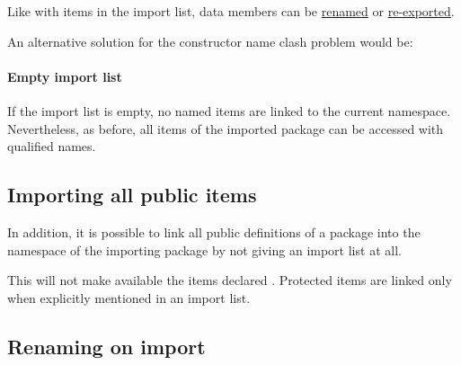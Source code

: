 
Like with items in the import list, data members can be  \hyperref[renameitem]{renamed} 
or  \hyperref[reexport]{re-exported}.
  
An alternative solution for the constructor name clash problem would be:


\paragraph*{Empty import list} If the import list is empty, no named items are linked to the current namespace. Nevertheless, as before, all items of the imported package can be accessed with qualified names.

\subsection{Importing all public items}

In addition, it is possible to link all public definitions of a
package into the namespace of the importing package by not giving an import list at all.

This will not make available the items declared . 
Protected items are linked only when explicitly mentioned in an import list.


\subsection{Renaming on import} \label{renameitem}

